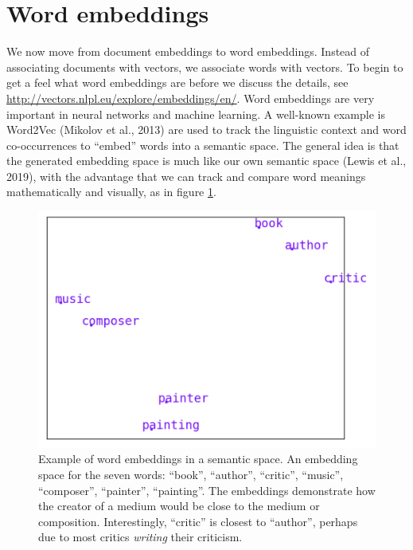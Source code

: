 \section{Word embeddings}

We now move from document embeddings to word embeddings.  Instead of associating documents with vectors, we associate words with vectors. To begin to get a feel what word embeddings are before we discuss the details, see \url{http://vectors.nlpl.eu/explore/embeddings/en/}. Word embeddings are very important in neural networks and machine learning. A well-known example is Word2Vec (Mikolov et al., 2013) are used to track the linguistic context and word co-occurrences to ``embed'' words into a semantic space. The general idea is that the generated embedding space is much like our own semantic space (Lewis et al., 2019), with the advantage that we can track and compare word meanings mathematically and visually, as in figure \ref{f:writerPainterExample}. 

\begin{figure}[h]
    \centering
    \includegraphics[scale=.5]{./images/Word_vector_demo.png}
    \caption[Generated using \url{http://vectors.nlpl.eu/explore/embeddings/en/}.]{Example of word embeddings in a semantic space. An embedding space for the seven words: ``book'', ``author'', ``critic'', ``music'', ``composer'', ``painter'', ``painting''. The embeddings demonstrate how the creator of a medium would be close to the medium or composition. Interestingly, ``critic'' is closest to ``author'', perhaps due to most critics \textit{writing} their criticism.}
 \label{f:writerPainterExample}
\end{figure}

